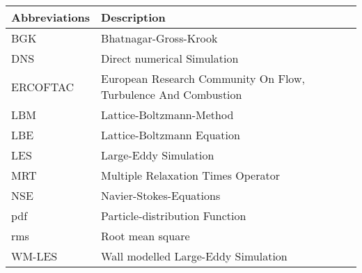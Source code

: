 \vspace{0.5cm}

\begin{tabular}{p{7cm}p{7cm}}
	Abbreviations & Description\\ \hline
	BGK         & Bhatnagar-Gross-Krook \\
	DNS         & Direct numerical Simulation \\
	ERCOFTAC	& European Research Community On Flow, Turbulence And Combustion \\
	LBM         & Lattice-Boltzmann-Method \\
	LBE         & Lattice-Boltzmann Equation \\
	LES         & Large-Eddy Simulation \\
	MRT         & Multiple Relaxation Times Operator \\
	NSE         & Navier-Stokes-Equations \\
	pdf         & Particle-distribution Function \\
	rms			& Root mean square \\
	WM-LES      & Wall modelled Large-Eddy Simulation
	
\end{tabular}
